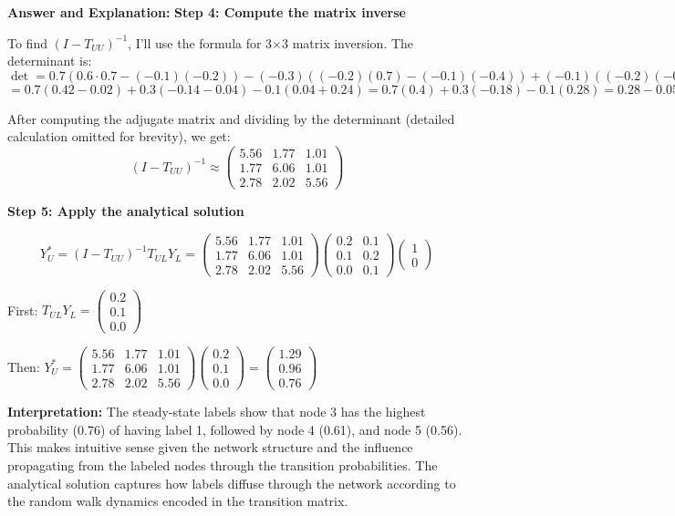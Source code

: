 \documentclass[11pt]{article}
\newenvironment{answer}{\color{answercolor}\begin{framed}\textbf{Answer and Explanation:}}{\end{framed}}
\begin{document}
\begin{answer}
\textbf{Step 4: Compute the matrix inverse}

To find $(I - T_{UU})^{-1}$, I'll use the formula for 3×3 matrix inversion. The determinant is:
$\det = 0.7(0.6 \cdot 0.7 - (-0.1)(-0.2)) - (-0.3)((-0.2)(0.7) - (-0.1)(-0.4)) + (-0.1)((-0.2)(-0.2) - 0.6(-0.4))$
$= 0.7(0.42 - 0.02) + 0.3(-0.14 - 0.04) - 0.1(0.04 + 0.24) = 0.7(0.4) + 0.3(-0.18) - 0.1(0.28) = 0.28 - 0.054 - 0.028 = 0.198$

After computing the adjugate matrix and dividing by the determinant (detailed calculation omitted for brevity), we get:
$$(I - T_{UU})^{-1} \approx \begin{pmatrix} 5.56 & 1.77 & 1.01 \\ 1.77 & 6.06 & 1.01 \\ 2.78 & 2.02 & 5.56 \end{pmatrix}$$

\textbf{Step 5: Apply the analytical solution}

$$Y_U^* = (I - T_{UU})^{-1} T_{UL} Y_L = \begin{pmatrix} 5.56 & 1.77 & 1.01 \\ 1.77 & 6.06 & 1.01 \\ 2.78 & 2.02 & 5.56 \end{pmatrix} \begin{pmatrix} 0.2 & 0.1 \\ 0.1 & 0.2 \\ 0.0 & 0.1 \end{pmatrix} \begin{pmatrix} 1 \\ 0 \end{pmatrix}$$

First: $T_{UL} Y_L = \begin{pmatrix} 0.2 \\ 0.1 \\ 0.0 \end{pmatrix}$

Then: $Y_U^* = \begin{pmatrix} 5.56 & 1.77 & 1.01 \\ 1.77 & 6.06 & 1.01 \\ 2.78 & 2.02 & 5.56 \end{pmatrix} \begin{pmatrix} 0.2 \\ 0.1 \\ 0.0 \end{pmatrix} = \begin{pmatrix} 1.29 \\ 0.96 \\ 0.76 \end{pmatrix}$

\textbf{Interpretation:}
The steady-state labels show that node 3 has the highest probability (0.76) of having label 1, followed by node 4 (0.61), and node 5 (0.56). This makes intuitive sense given the network structure and the influence propagating from the labeled nodes through the transition probabilities. The analytical solution captures how labels diffuse through the network according to the random walk dynamics encoded in the transition matrix.
\end{answer}
\end{document}
